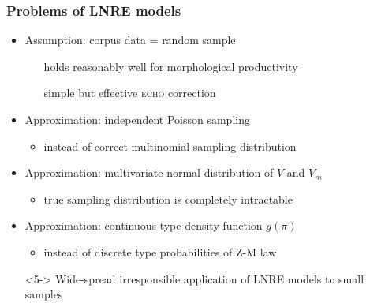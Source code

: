 \documentclass[handout,notes=show,t]{beamer} %
\begin{document}
\begin{frame}
  \frametitle{Problems of LNRE models}

  \ungap[1]
  \begin{itemize}
  \item Assumption: corpus data = random sample
    \begin{itemize}
    \item[\hand] holds reasonably well for morphological productivity
    \item[\hand] simple but effective \textsc{echo} correction \citep{Baroni:Evert:07a}
    \item[]
    \end{itemize}
  \item<2-> Approximation: independent Poisson sampling
    \begin{itemize}
    \item instead of correct multinomial sampling distribution
    \item[]
    \end{itemize}
  \item<3-> Approximation: multivariate normal distribution of $V$ and $V_m$
    \begin{itemize}
    \item true sampling distribution is completely intractable
    \item[]
    \end{itemize}
  \item<4-> Approximation: continuous type density function $g(\pi)$
    \begin{itemize}
    \item instead of discrete type probabilities of Z-M law
    \item[]
    \end{itemize}
  \item[\So]<5-> Wide-spread irresponsible application of LNRE models to small samples \citep[e.g.][]{Luedeling:Evert:05}
  \end{itemize}
\end{frame}
\end{document}
